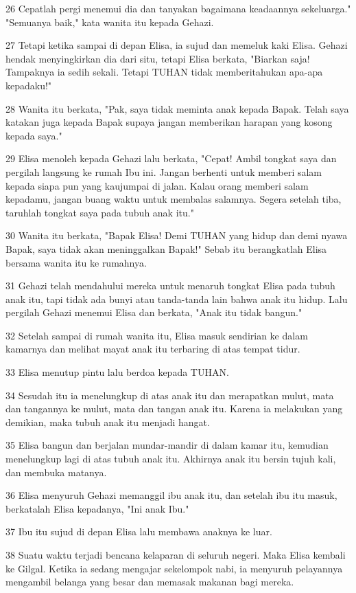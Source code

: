 \par 26 Cepatlah pergi menemui dia dan tanyakan bagaimana keadaannya sekeluarga." "Semuanya baik," kata wanita itu kepada Gehazi.
\par 27 Tetapi ketika sampai di depan Elisa, ia sujud dan memeluk kaki Elisa. Gehazi hendak menyingkirkan dia dari situ, tetapi Elisa berkata, "Biarkan saja! Tampaknya ia sedih sekali. Tetapi TUHAN tidak memberitahukan apa-apa kepadaku!"
\par 28 Wanita itu berkata, "Pak, saya tidak meminta anak kepada Bapak. Telah saya katakan juga kepada Bapak supaya jangan memberikan harapan yang kosong kepada saya."
\par 29 Elisa menoleh kepada Gehazi lalu berkata, "Cepat! Ambil tongkat saya dan pergilah langsung ke rumah Ibu ini. Jangan berhenti untuk memberi salam kepada siapa pun yang kaujumpai di jalan. Kalau orang memberi salam kepadamu, jangan buang waktu untuk membalas salamnya. Segera setelah tiba, taruhlah tongkat saya pada tubuh anak itu."
\par 30 Wanita itu berkata, "Bapak Elisa! Demi TUHAN yang hidup dan demi nyawa Bapak, saya tidak akan meninggalkan Bapak!" Sebab itu berangkatlah Elisa bersama wanita itu ke rumahnya.
\par 31 Gehazi telah mendahului mereka untuk menaruh tongkat Elisa pada tubuh anak itu, tapi tidak ada bunyi atau tanda-tanda lain bahwa anak itu hidup. Lalu pergilah Gehazi menemui Elisa dan berkata, "Anak itu tidak bangun."
\par 32 Setelah sampai di rumah wanita itu, Elisa masuk sendirian ke dalam kamarnya dan melihat mayat anak itu terbaring di atas tempat tidur.
\par 33 Elisa menutup pintu lalu berdoa kepada TUHAN.
\par 34 Sesudah itu ia menelungkup di atas anak itu dan merapatkan mulut, mata dan tangannya ke mulut, mata dan tangan anak itu. Karena ia melakukan yang demikian, maka tubuh anak itu menjadi hangat.
\par 35 Elisa bangun dan berjalan mundar-mandir di dalam kamar itu, kemudian menelungkup lagi di atas tubuh anak itu. Akhirnya anak itu bersin tujuh kali, dan membuka matanya.
\par 36 Elisa menyuruh Gehazi memanggil ibu anak itu, dan setelah ibu itu masuk, berkatalah Elisa kepadanya, "Ini anak Ibu."
\par 37 Ibu itu sujud di depan Elisa lalu membawa anaknya ke luar.
\par 38 Suatu waktu terjadi bencana kelaparan di seluruh negeri. Maka Elisa kembali ke Gilgal. Ketika ia sedang mengajar sekelompok nabi, ia menyuruh pelayannya mengambil belanga yang besar dan memasak makanan bagi mereka.
